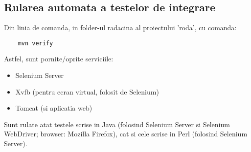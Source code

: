\subsection{Rularea automata a testelor de integrare}
Din linia de comanda, in folder-ul radacina al proiectului 'roda', cu comanda:
\begin{lstlisting}
	mvn verify
\end{lstlisting}
Astfel, sunt pornite/oprite serviciile:
\begin{itemize}
\item
Selenium Server
\item
Xvfb (pentru ecran virtual, folosit de Selenium)
\item
Tomcat (si aplicatia web)
\end{itemize}

Sunt rulate atat testele scrise in Java 
(folosind Selenium Server si Selenium WebDriver; browser: Mozilla Firefox), 
cat si cele scrise in Perl (folosind Selenium Server).

\begin{comment}
\subsection{Rularea automata a testelor web (Selenium)}
Din linia de comanda, in folder-ul radacina al proiectului 'roda', cu comanda:
\begin{lstlisting}
	mvn tomcat:run selenium:selenese
\end{lstlisting}
\end{comment}


